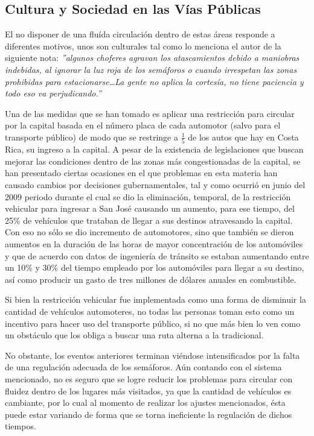 \documentclass[conference]{IEEEtran}
\begin{document}
	\subsection{Cultura y Sociedad en las V\'{i}as P\'{u}blicas}
		El no disponer de una flu\'{i}da circulaci\'{o}n dentro de estas \'{a}reas
		responde a diferentes motivos, unos son culturales tal como lo menciona el autor de la siguiente
	nota: \textit{''algunos choferes agravan los atascamientos debido a
	maniobras indebidas, al ignorar la luz roja de los sem\'{a}foros o cuando irrespetan las
	zonas prohibidas para estacionarse\ldots La gente no aplica la cortes\'{i}a, no
	tiene paciencia y todo eso va perjudicando.''}
	\cite{Villegas2012}
	
		Una de las medidas que se han tomado es aplicar una restricci\'on para circular por la capital basada en el n\'umero placa de cada automotor (salvo para el transporte p\'ublico) de modo que se restringe a  $\frac{1}{5}$ de los autos que hay en Costa Rica, su ingreso a la capital. A pesar de la existencia de legislaciones que buscan mejorar las condiciones dentro de las zonas m\'{a}s congestionadas de la capital, se han presentado ciertas ocasiones en el que problemas en esta materia han causado cambios por decisiones gubernamentales, tal y como ocurri\'{o} en junio del 2009 periodo durante el cual se dio la eliminaci\'{o}n, temporal, de la restricci\'{o}n vehicular para
	ingresar a San Jos\'{e} causando un aumento, para ese tiempo, del 25\% de
	veh\'{i}culos que trataban de llegar a sus destinos atravesando la
	capital. Con eso no s\'{o}lo se dio incremento de automotores, sino que
	tambi\'{e}n se dieron aumentos en la duraci\'{o}n de las horas de mayor
	concentraci\'{o}n de los autom\'{o}viles y que de acuerdo con datos de
	ingenier\'{i}a de tr\'{a}nsito se estaban aumentando entre un 10\% y 30\% 
	del tiempo empleado por los autom\'{o}viles para llegar a su destino, as\'{i} como
	producir un gasto de tres millones de d\'olares anuales en combustible.\cite{Mata2009}
		
		Si bien la restricci\'{o}n vehicular fue implementada como una forma de disminuir la cantidad de veh\'{i}culos automoteres, no todas las personas toman esto como un incentivo para hacer uso del transporte p\'{u}blico, si no que m\'{a}s bien lo ven como un obst\'{a}culo que los obliga a buscar una ruta alterna a la tradicional.
		
		No obstante, los eventos anteriores terminan vi\'{e}ndose intensificados  por la
	falta de una regulaci\'{o}n adecuada de los sem\'{a}foros. A\'un contando con el sistema
	mencionado, no es seguro que se logre reducir los problemas para circular con
	fluidez dentro de los lugares m\'{a}s visitados, ya que la cantidad de veh\'{i}culos es
	cambiante, por lo cual al momento de realizar los ajustes mencionados, \'{e}sta puede estar variando de forma que se torna ineficiente la regulaci\'{o}n de dichos tiempos.
\end{document}
